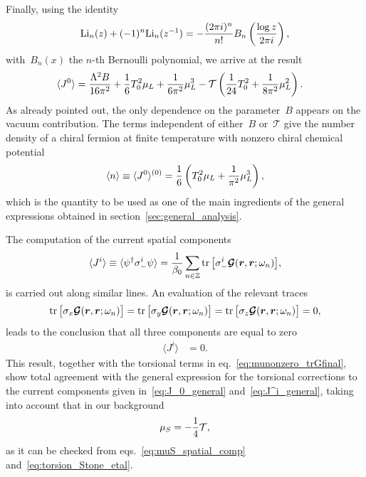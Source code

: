 \documentclass[11pt,a4paper]{article}
\begin{document}
Finally, using the identity~\cite{Lewin}
\begin{align}
{\rm Li}_{n}(z)+(-1)^{n}{\rm Li}_{n}(z^{-1})=-{(2\pi i)^{n}\over n!}B_{n}\left({\log{z}\over 2\pi i}\right),
\label{eq:poly_identity}
\end{align}
with~$B_{n}(x)$ the $n$-th Bernoulli polynomial, 
we arrive at the result
\begin{align}
\langle J^{0}\rangle
&={\Lambda^{2}B\over 16\pi^2}+{1\over 6}T_{0}^{2}\mu_{L}+{1\over 6\pi^{2}}\mu_{L}^{3}
-\mathcal{T}\left(
{1\over 24}T_{0}^{2}+{1\over 8\pi^{2}}\mu_{L}^{2}\right).
\label{eq:munonzero_trGfinal}
\end{align}
As already pointed out, the only dependence on the parameter~$B$ 
appears on the vacuum contribution.
The terms independent of either~$B$ or~$\mathcal{T}$ give the number density of a chiral
fermion at finite temperature with nonzero chiral chemical potential~\cite{Jaiswal:2015mxa}
\begin{align}
\langle n\rangle\equiv \langle J^{0}\rangle^{(0)}
={1\over 6}\left(T_{0}^{2}\mu_{L}+{1\over \pi^{2}}\mu_{L}^{3}\right),
\label{eq:micro_<n>_explicit}
\end{align} 
which is the quantity to be used as one of the main ingredients of 
the general expressions obtained in section~\ref{sec:general_analysis}.

The computation of the current spatial components
\begin{align}
\langle J^{i}\rangle\equiv\langle\psi^{\dagger}\sigma_{-}^{i}\psi\rangle=
{1\over \beta_{0}}\sum_{n\in\mathbb{Z}}{\rm tr\,}
\big[\sigma_{-}^{i}\boldsymbol{\mathcal{G}}(\boldsymbol{r},\boldsymbol{r};\omega_{n})\big],
\end{align}
is carried out along
similar lines. An evaluation of the relevant traces
\begin{align}
{\rm tr\,}
\big[\sigma_{x}\boldsymbol{\mathcal{G}}(\boldsymbol{r},\boldsymbol{r};\omega_{n})\big]=
{\rm tr\,}
\big[\sigma_{y}\boldsymbol{\mathcal{G}}(\boldsymbol{r},\boldsymbol{r};\omega_{n})\big]=
{\rm tr\,}
\big[\sigma_{z}\boldsymbol{\mathcal{G}}(\boldsymbol{r},\boldsymbol{r};\omega_{n})\big]=
0,
\end{align} 
leads to the conclusion that all three components are equal to zero
\begin{align}
\langle J^{i}\rangle&=0. 
\label{eq:result_chiral_current_stoneetal}
\end{align}
This result, together with the torsional terms 
in eq.~\eqref{eq:munonzero_trGfinal}, show total agreement
with the general expression for the torsional corrections to the current components
given in~\eqref{eq:J_0_general} and~\eqref{eq:J^i_general}, taking into account that
in our background
\begin{align}
\mu_{S}=-{1\over 4}\mathcal{T},
\label{eq:muS_Stone}
\end{align}
as it can be checked from eqs.~\eqref{eq:muS_spatial_comp} and~\eqref{eq:torsion_Stone_etal}.
\end{document}
